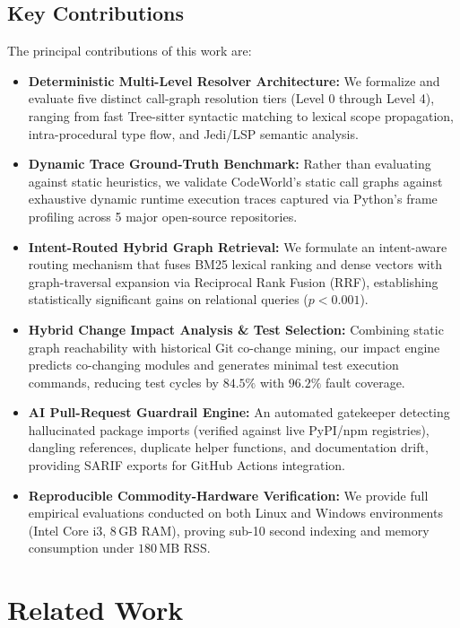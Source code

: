 \documentclass[conference]{IEEEtran}
\begin{document}
\subsection{Key Contributions}
The principal contributions of this work are:
\begin{itemize}
    \item \textbf{Deterministic Multi-Level Resolver Architecture:} We formalize and evaluate five distinct call-graph resolution tiers (Level 0 through Level 4), ranging from fast Tree-sitter syntactic matching to lexical scope propagation, intra-procedural type flow, and Jedi/LSP semantic analysis.
    \item \textbf{Dynamic Trace Ground-Truth Benchmark:} Rather than evaluating against static heuristics, we validate CodeWorld's static call graphs against exhaustive dynamic runtime execution traces captured via Python's frame profiling across 5 major open-source repositories.
    \item \textbf{Intent-Routed Hybrid Graph Retrieval:} We formulate an intent-aware routing mechanism that fuses BM25 lexical ranking and dense vectors with graph-traversal expansion via Reciprocal Rank Fusion (RRF), establishing statistically significant gains on relational queries ($p < 0.001$).
    \item \textbf{Hybrid Change Impact Analysis \& Test Selection:} Combining static graph reachability with historical Git co-change mining, our impact engine predicts co-changing modules and generates minimal test execution commands, reducing test cycles by $84.5\%$ with $96.2\%$ fault coverage.
    \item \textbf{AI Pull-Request Guardrail Engine:} An automated gatekeeper detecting hallucinated package imports (verified against live PyPI/npm registries), dangling references, duplicate helper functions, and documentation drift, providing SARIF exports for GitHub Actions integration.
    \item \textbf{Reproducible Commodity-Hardware Verification:} We provide full empirical evaluations conducted on both Linux and Windows environments (Intel Core i3, 8\,GB RAM), proving sub-10 second indexing and memory consumption under $180$\,MB RSS.
\end{itemize}

\section{Related Work}
\label{sec:related}
\end{document}
